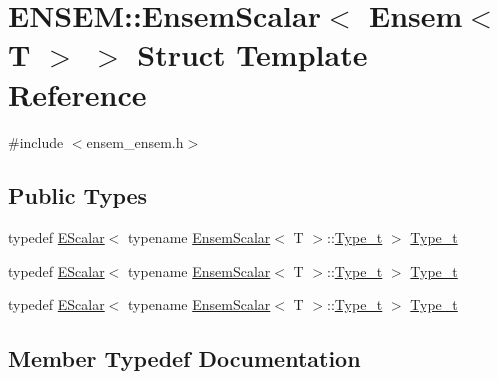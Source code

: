 \hypertarget{structENSEM_1_1EnsemScalar_3_01Ensem_3_01T_01_4_01_4}{}\section{E\+N\+S\+EM\+:\+:Ensem\+Scalar$<$ Ensem$<$ T $>$ $>$ Struct Template Reference}
\label{structENSEM_1_1EnsemScalar_3_01Ensem_3_01T_01_4_01_4}


{\ttfamily \#include $<$ensem\+\_\+ensem.\+h$>$}

\subsection*{Public Types}
\begin{DoxyCompactItemize}
\item 
typedef \mbox{\hyperlink{classENSEM_1_1EScalar}{E\+Scalar}}$<$ typename \mbox{\hyperlink{structENSEM_1_1EnsemScalar}{Ensem\+Scalar}}$<$ T $>$\+::\mbox{\hyperlink{structENSEM_1_1EnsemScalar_3_01Ensem_3_01T_01_4_01_4_a7452a3e2409e2d8a2ae3ea41eec32972}{Type\+\_\+t}} $>$ \mbox{\hyperlink{structENSEM_1_1EnsemScalar_3_01Ensem_3_01T_01_4_01_4_a7452a3e2409e2d8a2ae3ea41eec32972}{Type\+\_\+t}}
\item 
typedef \mbox{\hyperlink{classENSEM_1_1EScalar}{E\+Scalar}}$<$ typename \mbox{\hyperlink{structENSEM_1_1EnsemScalar}{Ensem\+Scalar}}$<$ T $>$\+::\mbox{\hyperlink{structENSEM_1_1EnsemScalar_3_01Ensem_3_01T_01_4_01_4_a7452a3e2409e2d8a2ae3ea41eec32972}{Type\+\_\+t}} $>$ \mbox{\hyperlink{structENSEM_1_1EnsemScalar_3_01Ensem_3_01T_01_4_01_4_a7452a3e2409e2d8a2ae3ea41eec32972}{Type\+\_\+t}}
\item 
typedef \mbox{\hyperlink{classENSEM_1_1EScalar}{E\+Scalar}}$<$ typename \mbox{\hyperlink{structENSEM_1_1EnsemScalar}{Ensem\+Scalar}}$<$ T $>$\+::\mbox{\hyperlink{structENSEM_1_1EnsemScalar_3_01Ensem_3_01T_01_4_01_4_a7452a3e2409e2d8a2ae3ea41eec32972}{Type\+\_\+t}} $>$ \mbox{\hyperlink{structENSEM_1_1EnsemScalar_3_01Ensem_3_01T_01_4_01_4_a7452a3e2409e2d8a2ae3ea41eec32972}{Type\+\_\+t}}
\end{DoxyCompactItemize}


\subsection{Member Typedef Documentation}
\mbox{\label{structENSEM_1_1EnsemScalar_3_01Ensem_3_01T_01_4_01_4_a7452a3e2409e2d8a2ae3ea41eec32972}} 
